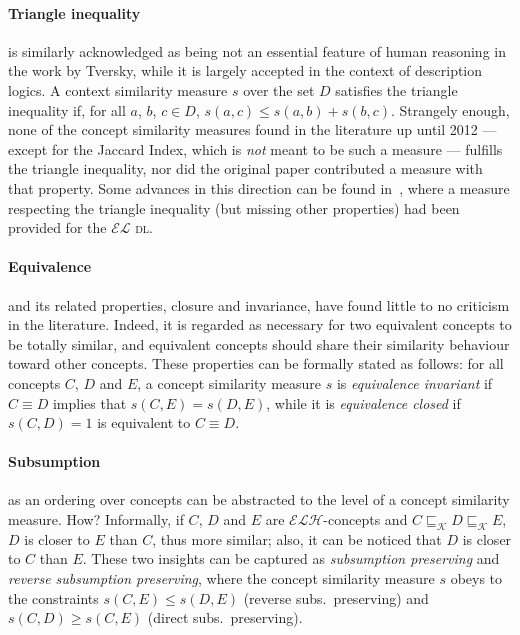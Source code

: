 \documentclass[]{llncs}
\theoremstyle{remark}
\newcommand{\el}{\(\mathcal{EL}{}\)}
\newcommand{\elh}{\(\mathcal{ELH}{}\)}
\newcommand{\dl}{\textsc{dl}}
\newcommand{\subsume}[1]{\sqsubseteq_{\mathcal{#1}}}
\begin{document}
  \paragraph{Triangle inequality} is similarly acknowledged as being not an essential feature of human reasoning in the work by Tversky, while it is largely accepted in the context of description logics.
  A context similarity measure \(s\) over the set \(D\) satisfies the triangle inequality if, for all \(a\), \(b\), \(c \in D\),
  \(s(a,c) \le s(a,b) + s(b,c)\).
  Strangely enough, none of the concept similarity measures found in the literature up until 2012 --- except for the Jaccard Index, which is \emph{not} meant to be such a measure --- fulfills the triangle inequality, nor did the original paper contributed a measure with that property.
  Some advances in this direction can be found in~\cite{DAB14}, where a measure respecting the triangle inequality (but missing other properties) had been provided for the \el{} \dl.

  \paragraph{Equivalence} and its related properties, closure and invariance, have found little to no criticism in the literature.
  Indeed, it is regarded as necessary for two equivalent concepts to be totally similar, and equivalent concepts should share their similarity behaviour toward other concepts.
  These properties can be formally stated as follows: for all concepts \(C\), \(D\) and \(E\), a concept similarity measure \(s\) is \emph{equivalence invariant} if \(C \equiv D\) implies that \(s(C,E) = s(D,E)\), while it is \emph{equivalence closed} if \(s(C,D) = 1\) is equivalent to \(C \equiv D\).

  \paragraph{Subsumption} as an ordering over concepts can be abstracted to the level of a concept similarity measure. How?
  Informally, if \(C\), \(D\) and \(E\) are \elh-concepts and \(C \subsume{K} D \subsume{K} E\), \(D\) is closer to \(E\) than \(C\), thus more similar;
  also, it can be noticed that \(D\) is closer to \(C\) than \(E\).
  These two insights can be captured as \emph{subsumption preserving} and \emph{reverse subsumption preserving}, where the concept similarity measure \(s\) obeys to the constraints \(s(C,E) \le s(D,E)\) (reverse subs.\ preserving) and \(s(C,D) \ge s(C,E)\) (direct subs.\ preserving).
\end{document}
